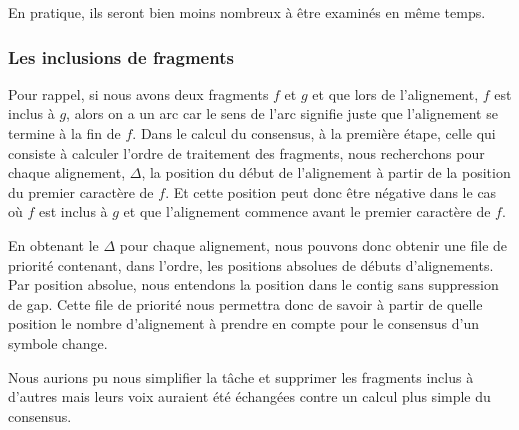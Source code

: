 En pratique, ils seront bien moins nombreux à être examinés en même temps.

\subsubsection*{Les inclusions de fragments}
Pour rappel, si nous avons deux fragments $f$ et $g$ et que lors de l'alignement, $f$ est inclus à $g$,
alors on a un arc  car le sens de l'arc signifie juste que l'alignement se termine à la fin de $f$.
Dans le calcul du consensus, à la première étape, celle qui consiste à calculer l'ordre de traitement des fragments,
nous recherchons pour chaque alignement, $\Delta$, la position du début de l'alignement à partir de la position du premier caractère de $f$.
Et cette position peut donc être négative dans le cas où $f$ est inclus à $g$ et que l'alignement commence avant le premier caractère de $f$.

En obtenant le $\Delta$ pour chaque alignement, nous pouvons donc obtenir une file de priorité contenant, dans l'ordre, les positions absolues de débuts d'alignements.
Par position absolue, nous entendons la position dans le contig sans suppression de gap.
Cette file de priorité nous permettra donc de savoir à partir de quelle position le nombre d'alignement à prendre en compte pour le consensus d'un symbole change.


Nous aurions pu nous simplifier la tâche et supprimer les fragments inclus à
d'autres mais leurs voix auraient été échangées contre un calcul plus simple
du consensus.
